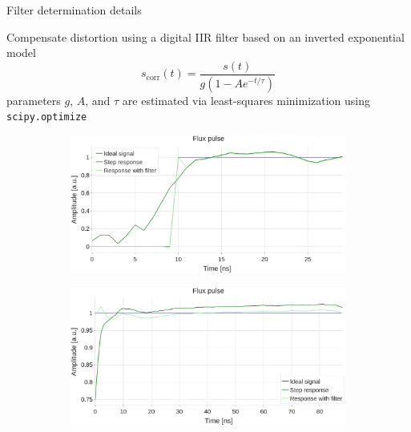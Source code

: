 \documentclass[aspectratio=169,10pt]{beamer}
\begin{document}
\begin{frame}{Filter determination details}
  \begin{center}
    Compensate distortion using a digital IIR filter based on an inverted exponential model
    \begin{equation*}
      s_{\text{corr}}(t) = \frac{s(t)}{g(1 - Ae^{-t/\tau})}
    \end{equation*}
    parameters $g$, $A$, and $\tau$ are estimated via least-squares minimization using \texttt{scipy.optimize}
  \end{center}

  \begin{figure}
    \centering
    \begin{subfigure}{0.48\textwidth}
      \includegraphics[width=\textwidth]{figures/step_inverse.png}
    \end{subfigure}
    \begin{subfigure}{0.48\textwidth}
      \includegraphics[width=\textwidth]{figures/inverse.png}
    \end{subfigure}
  \end{figure}

\end{frame}
\end{document}
